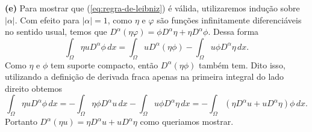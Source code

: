 \documentclass[a4paper, 11pt]{book}
\theoremstyle{definition}
\begin{document}
\begin{prf}
    \textbf{(e)} Para mostrar que (\ref{eq:regra-de-leibniz}) é válida, utilizaremos indução sobre $|\alpha|$. Com efeito para $|\alpha|= 1$, como $\eta$ e $\varphi$ são funções infinitamente diferenciáveis no sentido usual, temos que $D^{\alpha} (\eta \varphi) = \phi D^{\alpha}\eta + \eta D^{\alpha} \phi$.
    Dessa forma
    \[
        \int_\Omega \eta u D^{\alpha} \phi \, dx = \int_\Omega u D^{\alpha} (\eta \phi) - \int_\Omega u\phi D^{\alpha} \eta \, dx.
    \]
    Como $\eta$ e $\phi$ tem suporte compacto, então $D^{\alpha}(\eta \phi)$ também tem. 
    Dito isso, utilizando a definição de derivada fraca apenas na primeira integral do lado direito obtemos
    \[
        \int_\Omega \eta u D^{\alpha} \phi \, dx = -\int_\Omega \eta \phi D^{\alpha} u \, dx - \int_\Omega u\phi D^{\alpha} \eta \, dx = -\int_\Omega (\eta D^{\alpha}u + uD^{\alpha}\eta) \phi \,dx.
    \]
    Portanto $D^{\alpha}(\eta u) = \eta D^{\alpha}u + uD^{\alpha}\eta$ como queriamos mostrar.


\end{prf}
\end{document}
